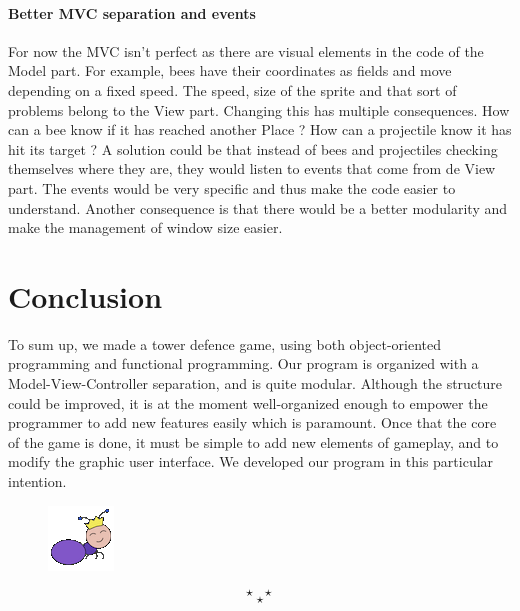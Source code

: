 \documentclass[
	a4paper
]{article}
\newcommand{\theEnd}{\[\star ~ ~ ~ \star\]\[\star\]}
\begin{document}
\paragraph{Better MVC separation and events} For now the MVC isn't perfect as there are visual elements in the code of the Model part. %
For example, bees have their coordinates as fields and move depending on a fixed speed. %
The speed, size of the sprite and that sort of problems belong to the View part. %
Changing this has multiple consequences. How can a bee know if it has reached another Place ? %
How can a projectile know it has hit its target ? %
A solution could be that instead of bees and projectiles checking themselves where they are, they would listen to events that come from de View part. %
The events would be very specific and thus make the code easier to understand. %
Another consequence is that there would be a better modularity and make the management of window size easier.


\section*{Conclusion} %

To sum up, we made a tower defence game, using both object-oriented programming and functional programming. %
Our program is organized with a Model-View-Controller separation, and is quite modular. %
Although the structure could be improved, it is at the moment well-organized enough to empower the programmer to add new features easily which is paramount. %
Once that the core of the game is done, it must be simple to add new elements of gameplay, and to modify the graphic user interface. %
We developed our program in this particular intention.


%
\begin{figure}[H]
	\includegraphics[scale=0.5]{ant_queen.png}
\end{figure}
%

\theEnd
\end{document}
